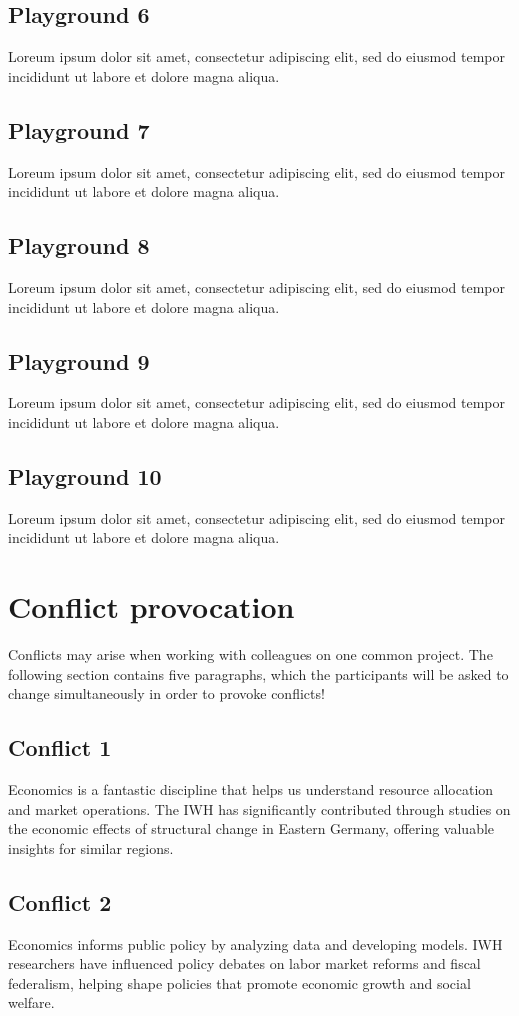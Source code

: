 \documentclass{article}
\begin{document}
\subsection{Playground 6}
Loreum ipsum dolor sit amet, consectetur adipiscing elit, sed do eiusmod tempor incididunt ut labore et dolore magna aliqua.
\subsection{Playground 7}
Loreum ipsum dolor sit amet, consectetur adipiscing elit, sed do eiusmod tempor incididunt ut labore et dolore magna aliqua.
\subsection{Playground 8}
Loreum ipsum dolor sit amet, consectetur adipiscing elit, sed do eiusmod tempor incididunt ut labore et dolore magna aliqua.
\subsection{Playground 9}
Loreum ipsum dolor sit amet, consectetur adipiscing elit, sed do eiusmod tempor incididunt ut labore et dolore magna aliqua.
\subsection{Playground 10}
Loreum ipsum dolor sit amet, consectetur adipiscing elit, sed do eiusmod tempor incididunt ut labore et dolore magna aliqua.




\section{Conflict provocation}
Conflicts may arise when working with colleagues on one common project. The following section contains five paragraphs, which the participants will be asked to change simultaneously in order to provoke conflicts!

\subsection{Conflict 1}
Economics is a fantastic discipline that helps us understand resource allocation and market operations. The IWH has significantly contributed through studies on the economic effects of structural change in Eastern Germany, offering valuable insights for similar regions.

\subsection{Conflict 2}
Economics informs public policy by analyzing data and developing models. IWH researchers have influenced policy debates on labor market reforms and fiscal federalism, helping shape policies that promote economic growth and social welfare.
\end{document}
